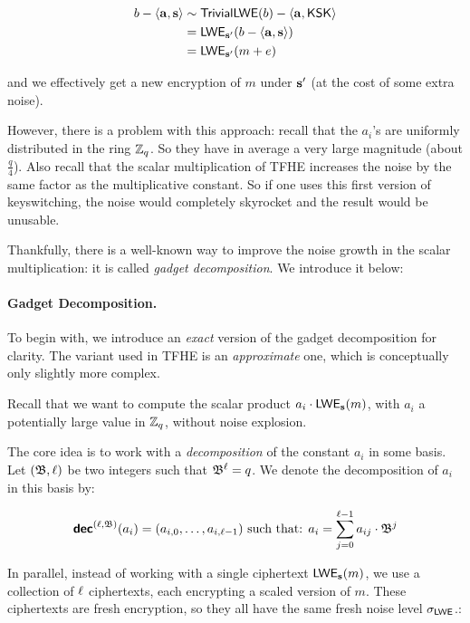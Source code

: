 \begin{align*}
	b - \langle \mathbf a, \mathbf s \rangle &\sim \textsf{TrivialLWE}(b) - \left \langle  \mathbf a, \textsf{KSK} \right \rangle\\
	& = \textsf{LWE}_{\mathbf s'}(b - \langle \mathbf a, \mathbf s \rangle)\\
		 &= \textsf{LWE}_{\mathbf s'}(m + e)
\end{align*}


and we effectively get a new encryption of $m$ under $\mathbf s'$ (at the cost of some extra noise).


However, there is a problem with this approach: recall that the $a_i$'s are uniformly distributed in the ring $\mathbb{Z}_q$. So they have in average a very large magnitude (about $\frac q 4$). Also recall that the scalar multiplication of TFHE increases the noise by the same factor as the multiplicative constant. So if one uses this first version of keyswitching, the noise would completely skyrocket and the result would be unusable.

Thankfully, there is a well-known way to improve the noise growth in the scalar multiplication: it is called \textit{gadget decomposition}. We introduce it below:

\paragraph{Gadget Decomposition.}

To begin with, we introduce an \textit{exact} version of the gadget decomposition for clarity. The variant used in TFHE is an \textit{approximate} one, which is conceptually only slightly more complex.


Recall that we want to compute the scalar product $a_i \cdot \textsf{LWE}_{\mathbf s}(m)$, with $a_i$ a potentially large value in $\mathbb{Z}_q$, without noise explosion.

The core idea is to work with a \textit{decomposition} of the constant $a_i$ in some basis. Let $(\mathfrak{B}, \ell)$ be two integers such that $\mathfrak{B}^\ell = q$. We denote the decomposition of $a_i$ in this basis by:

\[
	\textbf{\textsf{dec}}^{(\ell, \mathfrak{B})}(a_i) = (a_{i,0}, \dots, a_{i, \ell-1}) \text{ such that: } a_i = \sum_{j=0}^{\ell-1} a_{ij} \cdot \mathfrak{B}^j
\]

In parallel, instead of working with a single ciphertext $\textsf{LWE}_{\mathbf s}(m)$, we use a collection of $\ell$ ciphertexts, each encrypting a scaled version of $m$. These ciphertexts are fresh encryption, so they all have the same fresh noise level $\sigma_{\textsf{LWE}}$.: 

